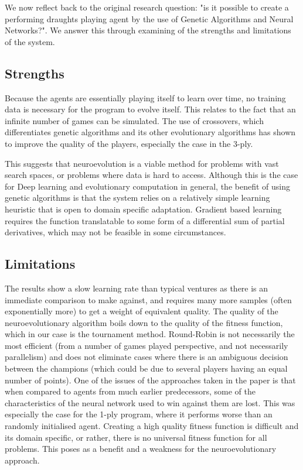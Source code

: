 \documentclass[12pt,a4paper]{article}
\begin{document}

    We now reflect back to the original research question: "is it possible to create a performing draughts playing agent by the use of Genetic Algorithms and Neural Networks?".  We answer this through examining of the strengths and limitations of the system. 

    \subsection{Strengths}
    Because the agents are essentially playing itself to learn over time, no training data is necessary for the program to evolve itself. This relates to the fact that an infinite number of games can be simulated. The use of crossovers, which differentiates genetic algorithms and its other evolutionary algorithms has shown to improve the quality of the players, especially the case in the 3-ply.
    
    This suggests that neuroevolution is a viable method for problems with vast search spaces, or problems where data is hard to access. Although this is the case for Deep learning and evolutionary computation in general, the benefit of using genetic algorithms is that the system relies on a relatively simple learning heuristic that is open to domain specific adaptation. Gradient based learning requires the function  translatable to some form of a differential sum of partial derivatives, which may not be feasible in some circumstances.

    \subsection{Limitations}
    The results show a slow learning rate than typical ventures as there is an immediate comparison to make against, and requires many more samples (often exponentially more) to get a weight of equivalent quality.
    The quality of the neuroevolutionary algorithm boils down to the quality of the fitness function, which in our case is the tournament method. Round-Robin is not necessarily the most efficient (from a number of games played perspective, and not necessarily parallelism) and does not eliminate cases where there is an ambiguous decision between the champions (which could be due to several players having an equal number of points). One of the issues of the approaches taken in the paper is that when compared to agents from much earlier predecessors, some of the characteristics of the neural network used to win against them are lost. This was especially the case for the 1-ply program, where it performs worse than an randomly initialised agent. Creating a high quality fitness function is difficult and its domain specific, or rather, there is no universal fitness function for all problems. This poses as a benefit and a weakness for the neuroevolutionary approach.
   
\end{document}
